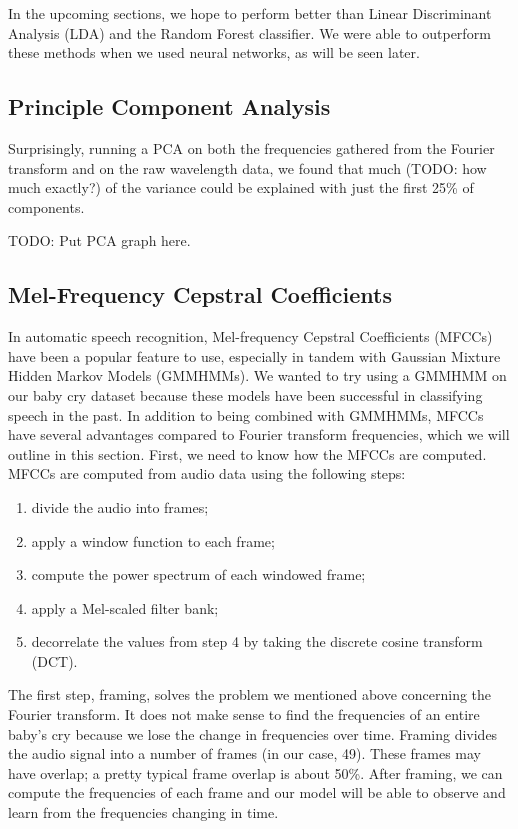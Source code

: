 \documentclass[11pt]{article}
\begin{document}
In the upcoming sections, we hope to perform better than Linear Discriminant Analysis (LDA) and the Random Forest classifier.
We were able to outperform these methods when we used neural networks, as will be seen later.

\subsection{Principle Component Analysis}
Surprisingly, running a PCA on both the frequencies gathered from the Fourier transform and on the raw wavelength data, we found that much (TODO: how much exactly?) of the variance could be explained with just the first 25\% of components.

TODO: Put PCA graph here.

\subsection{Mel-Frequency Cepstral Coefficients}
In automatic speech recognition, Mel-frequency Cepstral Coefficients (MFCCs) have been a popular feature to use, especially in tandem with Gaussian Mixture Hidden Markov Models (GMMHMMs).
We wanted to try using a GMMHMM on our baby cry dataset because these models have been successful in classifying speech in the past.
In addition to being combined with GMMHMMs, MFCCs have several advantages compared to Fourier transform frequencies, which we will outline in this section.
First, we need to know how the MFCCs are computed.
MFCCs are computed from audio data using the following steps:
\begin{enumerate}
   \item divide the audio into frames;
   \item apply a window function to each frame;
   \item compute the power spectrum of each windowed frame;
   \item apply a Mel-scaled filter bank;
   \item decorrelate the values from step 4 by taking the discrete cosine transform (DCT).
\end{enumerate}

The first step, framing, solves the problem we mentioned above concerning the Fourier transform.
It does not make sense to find the frequencies of an entire baby's cry because we lose the change in frequencies over time.
Framing divides the audio signal into a number of frames (in our case, 49).
These frames may have overlap; a pretty typical frame overlap is about 50\%.
After framing, we can compute the frequencies of each frame and our model will be able to observe and learn from the frequencies changing in time.
\end{document}
